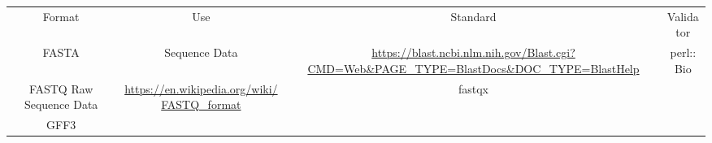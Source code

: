 \begin{tabular}{cccc}
{Format} & {Use} & {Standard} & {Validator} \\
FASTA & Sequence Data & \url{https://blast.ncbi.nlm.nih.gov/Blast.cgi?CMD=Web&PAGE_TYPE=BlastDocs&DOC_TYPE=BlastHelp} & perl::Bio \\
FASTQ  Raw Sequence Data & \url{https://en.wikipedia.org/wiki/FASTQ_format} & fastqx \\
GFF3 
\end{tabular}